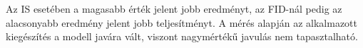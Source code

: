 



\noindent Az IS esetében a magasabb érték jelent jobb eredményt, az FID-nál pedig az alacsonyabb eredmény jelent jobb teljesítményt. A mérés alapján az alkalmazott kiegészítés a modell javára vált, viszont nagymértékű javulás nem tapasztalható.
